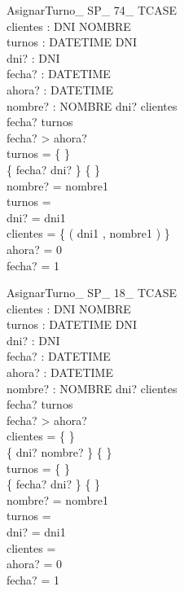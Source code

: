 \documentclass[%
  fleqn,colorlinks,linkcolor=blue,citecolor=blue,urlcolor=blue]{eptcs}
\begin{document}
\begin{schema}{AsignarTurno\_ SP\_ 74\_ TCASE}\\
 clientes : DNI \pfun NOMBRE \\
 turnos : DATETIME \pfun DNI \\
 dni? : DNI \\
 fecha? : DATETIME \\
 ahora? : DATETIME \\
 nombre? : NOMBRE
\where
 dni? \in \dom clientes \\
 fecha? \notin \dom turnos \\
 fecha? > ahora? \\
 turnos = \{ \} \\
 \{ fecha? \mapsto dni? \} \neq \{ \} \\
 nombre? = nombre1 \\
 turnos =~\emptyset \\
 dni? = dni1 \\
 clientes = \{ ( dni1 , nombre1 ) \} \\
 ahora? = 0 \\
 fecha? = 1
\end{schema}


\begin{schema}{AsignarTurno\_ SP\_ 18\_ TCASE}\\
 clientes : DNI \pfun NOMBRE \\
 turnos : DATETIME \pfun DNI \\
 dni? : DNI \\
 fecha? : DATETIME \\
 ahora? : DATETIME \\
 nombre? : NOMBRE
\where
 dni? \notin \dom clientes \\
 fecha? \notin \dom turnos \\
 fecha? > ahora? \\
 clientes = \{ \} \\
 \{ dni? \mapsto nombre? \} \neq \{ \} \\
 turnos = \{ \} \\
 \{ fecha? \mapsto dni? \} \neq \{ \} \\
 nombre? = nombre1 \\
 turnos =~\emptyset \\
 dni? = dni1 \\
 clientes =~\emptyset \\
 ahora? = 0 \\
 fecha? = 1
\end{schema}
\end{document}
